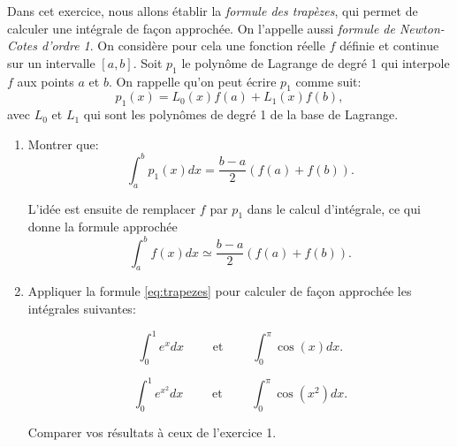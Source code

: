 \medskip

\begin{exercice}

Dans cet exercice, nous allons établir la \emph{formule des trap\`ezes}, qui permet de calculer une intégrale de façon approchée. On l'appelle aussi \emph{formule de Newton-Cotes d'ordre 1}. On considère pour cela une fonction réelle $f$ définie et continue sur un intervalle $[a,b]$. Soit $p_1$ le polynôme de Lagrange de degré 1 qui interpole $f$ aux points $a$ et $b$. On rappelle qu'on peut écrire $p_1$ comme suit:
\[
p_1(x) = L_0(x) f(a) + L_1(x) f(b),
\]
avec $L_0$ et $L_1$ qui sont les polynômes de degré 1 de la base de Lagrange.

\begin{enumerate}

\item Montrer que:
\[
\int_a^b p_1(x) dx = \frac{b-a}2 ( f(a) + f(b) ).
\]

L'idée est ensuite de remplacer $f$ par $p_1$ dans le calcul d'intégrale, ce qui donne la formule approchée 
\begin{equation} \label{eq:trapezes}
\int_a^b f(x) dx \simeq \frac{b-a}2 ( f(a) + f(b) ).
\end{equation}

\item Appliquer la formule \eqref{eq:trapezes} pour calculer de façon approchée les intégrales suivantes:

$$ \int_0^1 e^x dx \qquad \mbox{ et } \qquad \int_0^\pi \cos(x) dx.$$

$$ \int_0^1 e^{x^2} dx \qquad \mbox{ et } \qquad \int_0^\pi \cos(x^2) dx.$$

Comparer vos résultats à ceux de l'exercice 1.

\end{enumerate}

\end{exercice}

\medskip

